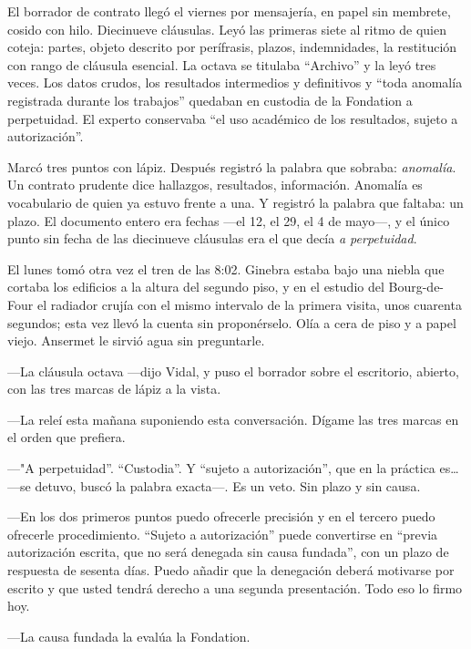 El borrador de contrato llegó el viernes por mensajería, en papel sin membrete, cosido con hilo. Diecinueve cláusulas. Leyó las primeras siete al ritmo de quien coteja: partes, objeto descrito por perífrasis, plazos, indemnidades, la restitución con rango de cláusula esencial. La octava se titulaba ``Archivo'' y la leyó tres veces. Los datos crudos, los resultados intermedios y definitivos y ``toda anomalía registrada durante los trabajos'' quedaban en custodia de la Fondation a perpetuidad. El experto conservaba ``el uso académico de los resultados, sujeto a autorización''.

Marcó tres puntos con lápiz. Después registró la palabra que sobraba: \textit{anomalía}. Un contrato prudente dice hallazgos, resultados, información. Anomalía es vocabulario de quien ya estuvo frente a una. Y registró la palabra que faltaba: un plazo. El documento entero era fechas ---el 12, el 29, el 4 de mayo---, y el único punto sin fecha de las diecinueve cláusulas era el que decía \textit{a perpetuidad}.


\scenebreak


El lunes tomó otra vez el tren de las 8:02. Ginebra estaba bajo una niebla que cortaba los edificios a la altura del segundo piso, y en el estudio del Bourg-de-Four el radiador crujía con el mismo intervalo de la primera visita, unos cuarenta segundos; esta vez llevó la cuenta sin proponérselo. Olía a cera de piso y a papel viejo. Ansermet le sirvió agua sin preguntarle.

---La cláusula octava ---dijo Vidal, y puso el borrador sobre el escritorio, abierto, con las tres marcas de lápiz a la vista.

---La releí esta mañana suponiendo esta conversación. Dígame las tres marcas en el orden que prefiera.

---"A perpetuidad''. ``Custodia''. Y ``sujeto a autorización'', que en la práctica es\ldots{} ---se detuvo, buscó la palabra exacta---. Es un veto. Sin plazo y sin causa.

---En los dos primeros puntos puedo ofrecerle precisión y en el tercero puedo ofrecerle procedimiento. ``Sujeto a autorización'' puede convertirse en ``previa autorización escrita, que no será denegada sin causa fundada'', con un plazo de respuesta de sesenta días. Puedo añadir que la denegación deberá motivarse por escrito y que usted tendrá derecho a una segunda presentación. Todo eso lo firmo hoy.

---La causa fundada la evalúa la Fondation.


